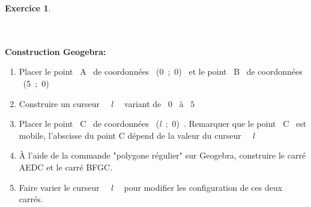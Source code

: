 \documentclass[a4paper,10pt]{article}
\theoremstyle{definition}
\theoremstyle{definition}
\newtheorem*{exo}{Exercice}
\begin{document}
\begin{exo}
\begin{figure}[h!]
\begin{minipage}[c]{.5\textwidth}
	\label{fig4}
\end{minipage}
\end{figure}
\quad\\\\
\noindent\textbf{Construction Geogebra:}\\
\begin{enumerate}
	\item Placer le point ~A~ de coordonnées ~(0~;~0)~ et le point ~B~ de coordonnées ~(5~;~0)~\\ 
	\item Construire un curseur ~~\textit{l}~~ variant de ~$0$~ à ~$5$~\\
	\item Placer le point ~C~ de coordonnées ~(\textit{l}~;~0)~. Remarquer que le point ~C~ est mobile, l'abscisse du point C dépend de la valeur du curseur ~~\textit{l}~~\\
	\item À l'aide de la commande "polygone régulier" sur Geogebra, construire le carré AEDC et le carré BFGC.\\ 
	\item Faire varier le curseur ~~\textit{l}~~ pour modifier les configuration de ces deux carrés. 
	
\end{enumerate}



\end{exo}
\end{document}
